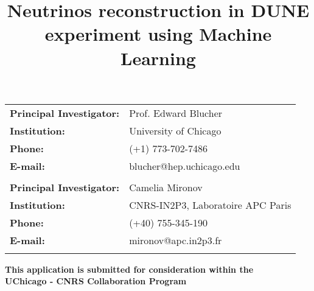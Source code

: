 \begin{titlepage}
\vspace{2.2 cm}
\title{\textbf{Neutrinos reconstruction in DUNE experiment using Machine Learning}}

\vspace{.2 cm} 

\begin{center}
\begin{tabular}{ll}
 
\textbf{Principal Investigator:} & Prof. Edward Blucher \\
\textbf{Institution:}                    & University of Chicago \\
\textbf{Phone:}  		      & (+1) 773-702-7486 \\
\textbf{E-mail:}  		      & blucher@hep.uchicago.edu \\
& \\
\textbf{Principal Investigator:}  & Camelia Mironov \\
\textbf{Institution:}                    & CNRS-IN2P3, Laboratoire APC Paris\\
\textbf{Phone:} & 			 (+40) 755-345-190 \\
\textbf{E-mail:} & 			 mironov@apc.in2p3.fr \\
& \\
\end{tabular}

\vspace{2 cm} 
\textbf{This application is submitted for consideration within the\\ UChicago - CNRS Collaboration Program}

\end{center}



\end{titlepage}





